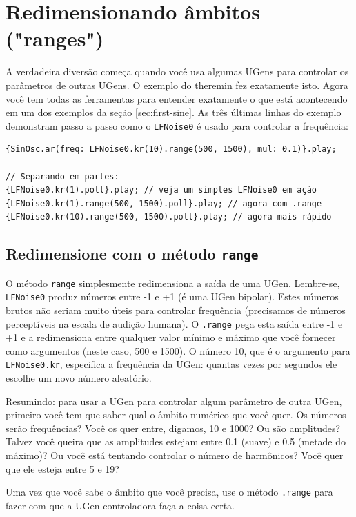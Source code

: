 \section{Redimensionando âmbitos ("ranges")}

A verdadeira diversão começa quando você usa algumas UGens para controlar os parâmetros de outras UGens. O exemplo do theremin fez exatamente isto. Agora você tem todas as ferramentas para entender exatamente o que está acontecendo em um dos exemplos da seção \ref{sec:first-sine}. As três últimas linhas do exemplo demonstram passo a passo como o \texttt{LFNoise0} é usado para controlar a frequência:

\begin{lstlisting}[style=SuperCollider-IDE, basicstyle=\scttfamily\footnotesize]
{SinOsc.ar(freq: LFNoise0.kr(10).range(500, 1500), mul: 0.1)}.play;

// Separando em partes:
{LFNoise0.kr(1).poll}.play; // veja um simples LFNoise0 em ação
{LFNoise0.kr(1).range(500, 1500).poll}.play; // agora com .range
{LFNoise0.kr(10).range(500, 1500).poll}.play; // agora mais rápido
\end{lstlisting}

\subsection{Redimensione com o método \texttt{range}}
O método  \texttt{range} simplesmente redimensiona a saída de uma UGen. Lembre-se, \texttt{LFNoise0} produz números entre -1 e +1 (é uma UGen bipolar). Estes números brutos não seriam muito úteis para controlar frequência (precisamos de números perceptíveis na escala de audição humana). O \texttt{.range} pega esta saída entre -1 e +1 e a redimensiona entre qualquer valor mínimo e máximo que você fornecer como argumentos (neste caso, 500 e 1500). O número 10, que é o argumento para \texttt{LFNoise0.kr}, especifica a frequência da UGen: quantas vezes por segundos ele escolhe um novo número aleatório.

Resumindo: para usar a UGen para controlar algum parâmetro de outra UGen, primeiro você tem que saber qual o âmbito numérico que você quer. Os números serão frequências? Você os quer entre, digamos, 10 e 1000? Ou são amplitudes? Talvez você queira que as amplitudes estejam entre 0.1 (suave) e 0.5 (metade do máximo)? Ou você está tentando controlar o número de harmônicos? Você quer que ele esteja entre 5 e 19?

Uma vez que você sabe o âmbito que você precisa, use o método \texttt{.range} para fazer com que a UGen controladora faça a coisa certa.

